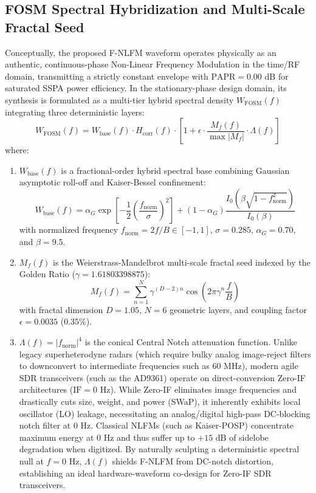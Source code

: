 \documentclass[journal,compsoc]{IEEEtran}
\begin{document}
\subsection{FOSM Spectral Hybridization and Multi-Scale Fractal Seed}
Conceptually, the proposed F-NLFM waveform operates physically as an authentic, continuous-phase Non-Linear Frequency Modulation in the time/RF domain, transmitting a strictly constant envelope with $\text{PAPR} = 0.00\text{ dB}$ for saturated SSPA power efficiency. In the stationary-phase design domain, its synthesis is formulated as a multi-tier hybrid spectral density $W_{\text{FOSM}}(f)$ integrating three deterministic layers:
\begin{equation}
W_{\text{FOSM}}(f) = W_{\text{base}}(f) \cdot H_{\text{corr}}(f) \cdot \left[ 1 + \epsilon \cdot \frac{M_f(f)}{\max|M_f|} \cdot \Lambda(f) \right]
\label{eq:fosm_psd}
\end{equation}
where:
\begin{enumerate}
    \item $W_{\text{base}}(f)$ is a fractional-order hybrid spectral base combining Gaussian asymptotic roll-off and Kaiser-Bessel confinement:
    \begin{equation}
    W_{\text{base}}(f) = \alpha_G \exp\left[-\frac{1}{2}\left(\frac{f_{\text{norm}}}{\sigma}\right)^2\right] + (1 - \alpha_G) \frac{I_0\left(\beta\sqrt{1 - f_{\text{norm}}^2}\right)}{I_0(\beta)}
    \end{equation}
    with normalized frequency $f_{\text{norm}} = 2f/B \in [-1, 1]$, $\sigma = 0.285$, $\alpha_G = 0.70$, and $\beta = 9.5$.
    
    \item $M_f(f)$ is the Weierstrass-Mandelbrot multi-scale fractal seed indexed by the Golden Ratio ($\gamma = 1.61803398875$):
    \begin{equation}
    M_f(f) = \sum_{n=1}^{N} \gamma^{(D-2)n} \cos\left(2\pi \gamma^n \frac{f}{B}\right)
    \end{equation}
    with fractal dimension $D = 1.05$, $N = 6$ geometric layers, and coupling factor $\epsilon = 0.0035$ ($0.35\%$).
    
    \item $\Lambda(f) = |f_{\text{norm}}|^4$ is the conical Central Notch attenuation function. Unlike legacy superheterodyne radars (which require bulky analog image-reject filters to downconvert to intermediate frequencies such as $60\text{ MHz}$), modern agile SDR transceivers (such as the AD9361) operate on direct-conversion Zero-IF architectures ($\text{IF}=0\text{ Hz}$). While Zero-IF eliminates image frequencies and drastically cuts size, weight, and power (SWaP), it inherently exhibits local oscillator (LO) leakage, necessitating an analog/digital high-pass DC-blocking notch filter at $0\text{ Hz}$. Classical NLFMs (such as Kaiser-POSP) concentrate maximum energy at $0\text{ Hz}$ and thus suffer up to $+15\text{ dB}$ of sidelobe degradation when digitized. By naturally sculpting a deterministic spectral null at $f=0\text{ Hz}$, $\Lambda(f)$ shields F-NLFM from DC-notch distortion, establishing an ideal hardware-waveform co-design for Zero-IF SDR transceivers.
\end{enumerate}
\end{document}
